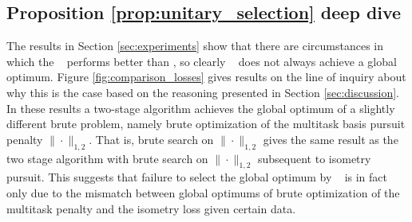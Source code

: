 \newpage

\subsection{Proposition \ref{prop:unitary_selection} deep dive}
\label{sec:deep_dive}

The results in Section \ref{sec:experiments} show that there are circumstances in which the \greedy~ performs better than \tsip, so clearly \tsip~ does not always achieve a global optimum.
Figure \ref{fig:comparison_losses} gives results on the line of inquiry about why this is the case based on the reasoning presented in Section \ref{sec:discussion}.
In these results a two-stage algorithm achieves the global optimum of a slightly different brute problem, namely brute optimization of the multitask basis pursuit penalty $\|\cdot \|_{1,2}$.
That is, brute search on $\|\cdot \|_{1,2}$ gives the same result as the two stage algorithm with brute search on $\|\cdot \|_{1,2}$ subsequent to isometry pursuit.
This suggests that failure to select the global optimum by \tsip~ is in fact only due to the mismatch between global optimums of brute optimization of the multitask penalty and the isometry loss given certain data.

